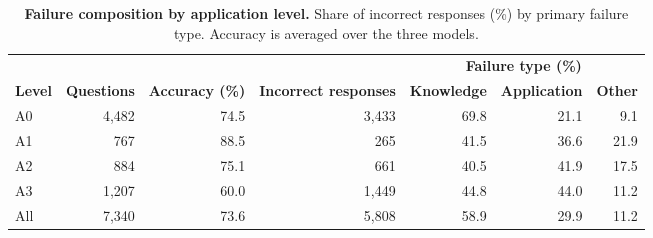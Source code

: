 \begin{table}[t]
\centering
\small
\caption{\textbf{Failure composition by application level.}
Share of incorrect responses (\%) by primary failure type. Accuracy is averaged over the three models.}
\label{tab:failure_by_a}
\begin{tabular*}{\textwidth}{@{\extracolsep{\fill}}lrrrrrr@{}}
\toprule
 & & & & \multicolumn{3}{c}{\textbf{Failure type (\%)}} \\
\cmidrule{5-7}
\textbf{Level} & \textbf{Questions} & \textbf{Accuracy (\%)} & \textbf{Incorrect responses} & \textbf{Knowledge} & \textbf{Application} & \textbf{Other} \\
\midrule
A0  & 4,482 & 74.5 & 3,433 & 69.8 & 21.1 & 9.1  \\
A1  & 767   & 88.5 & 265   & 41.5 & 36.6 & 21.9 \\
A2  & 884   & 75.1 & 661   & 40.5 & 41.9 & 17.5 \\
A3  & 1,207 & 60.0 & 1,449 & 44.8 & 44.0 & 11.2 \\
\midrule
All & 7,340 & 73.6 & 5,808 & 58.9 & 29.9 & 11.2 \\
\bottomrule
\end{tabular*}
\end{table}